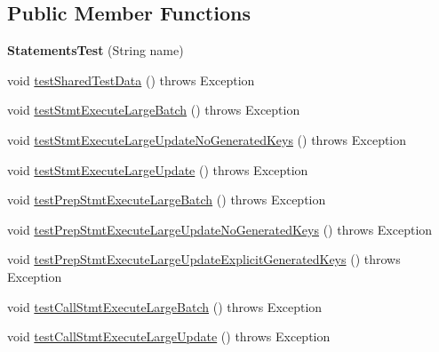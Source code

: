 \subsection*{Public Member Functions}
\begin{DoxyCompactItemize}
\item 
\mbox{\label{classtestsuite_1_1simple_1_1jdbc42_1_1_statements_test_a1f2e492abe06f7fdb25810a53ec717aa}} 
{\bfseries Statements\+Test} (String name)
\item 
void \mbox{\hyperlink{classtestsuite_1_1simple_1_1jdbc42_1_1_statements_test_a2d88ded5fbf027927ef3ebacf0022f19}{test\+Shared\+Test\+Data}} ()  throws Exception 
\item 
void \mbox{\hyperlink{classtestsuite_1_1simple_1_1jdbc42_1_1_statements_test_a51e52666eaf0d079f1de90acf5a5c167}{test\+Stmt\+Execute\+Large\+Batch}} ()  throws Exception 
\item 
void \mbox{\hyperlink{classtestsuite_1_1simple_1_1jdbc42_1_1_statements_test_a9cba5de95ea1762518b2af4a7f6f297a}{test\+Stmt\+Execute\+Large\+Update\+No\+Generated\+Keys}} ()  throws Exception 
\item 
void \mbox{\hyperlink{classtestsuite_1_1simple_1_1jdbc42_1_1_statements_test_ad62dd69666cad4c9913b528125dd2025}{test\+Stmt\+Execute\+Large\+Update}} ()  throws Exception 
\item 
void \mbox{\hyperlink{classtestsuite_1_1simple_1_1jdbc42_1_1_statements_test_a87e9f323d5228d9dc7edb68957cc238a}{test\+Prep\+Stmt\+Execute\+Large\+Batch}} ()  throws Exception 
\item 
void \mbox{\hyperlink{classtestsuite_1_1simple_1_1jdbc42_1_1_statements_test_a2629615e573805e4404fa4dc622627d7}{test\+Prep\+Stmt\+Execute\+Large\+Update\+No\+Generated\+Keys}} ()  throws Exception 
\item 
void \mbox{\hyperlink{classtestsuite_1_1simple_1_1jdbc42_1_1_statements_test_aac750e8880acef04f63aef9ba9257c62}{test\+Prep\+Stmt\+Execute\+Large\+Update\+Explicit\+Generated\+Keys}} ()  throws Exception 
\item 
void \mbox{\hyperlink{classtestsuite_1_1simple_1_1jdbc42_1_1_statements_test_a1b9dce514508b7f59df40c58b5c7a216}{test\+Call\+Stmt\+Execute\+Large\+Batch}} ()  throws Exception 
\item 
void \mbox{\hyperlink{classtestsuite_1_1simple_1_1jdbc42_1_1_statements_test_a52faef374ab1974e03f0809a89b39905}{test\+Call\+Stmt\+Execute\+Large\+Update}} ()  throws Exception 

\end{DoxyCompactItemize}
